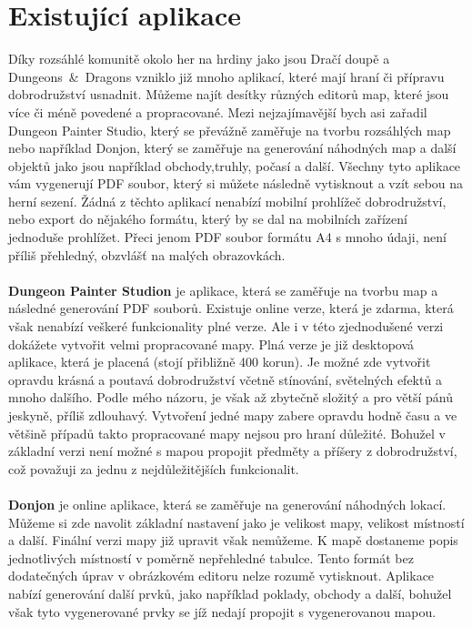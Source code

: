 \documentclass[thesis=B,czech]{resources/FITthesis}[2012/06/26]
\begin{document}
	\section{Existující aplikace}
Díky rozsáhlé komunitě okolo her na hrdiny jako jsou Dračí doupě a Dungeons~\&~Dragons vzniklo již mnoho aplikací, které mají hraní či přípravu dobrodružství usnadnit. Můžeme najít desítky různých editorů map, které jsou více či méně povedené a propracované. Mezi nejzajímavější bych asi zařadil Dungeon Painter Studio, který se převážně zaměřuje na tvorbu rozsáhlých map nebo například Donjon, který se zaměřuje na generování náhodných map a další objektů jako jsou například obchody,truhly, počasí a další. Všechny tyto aplikace vám vygenerují PDF soubor, který si můžete následně vytisknout a vzít sebou na herní sezení. Žádná z těchto aplikací nenabízí mobilní prohlížeč dobrodružství, nebo export do nějakého formátu, který by se dal na mobilních zařízení jednoduše prohlížet. Přeci jenom PDF soubor formátu A4 s mnoho údaji, není příliš přehledný, obzvlášť na malých obrazovkách. \\
\\
\textbf{Dungeon Painter Studion} je aplikace, která se zaměřuje na tvorbu map a následné generování PDF souborů. Existuje online verze, která je zdarma, která však nenabízí veškeré funkcionality plné verze. Ale i v této zjednodušené verzi dokážete vytvořit velmi propracované mapy. Plná verze je již desktopová aplikace, která je placená (stojí  přibližně 400 korun). Je možné zde vytvořit opravdu krásná a poutavá dobrodružství včetně stínování, světelných efektů a mnoho dalšího. Podle mého názoru, je však až zbytečně složitý a pro větší pánů jeskyně, příliš zdlouhavý. Vytvoření jedné mapy zabere opravdu hodně času a ve většině případů takto propracované mapy nejsou pro hraní důležité. Bohužel v základní verzi není možné s mapou propojit předměty a příšery z dobrodružství, což považuji za jednu z nejdůležitějších funkcionalit. \\
\\
\textbf{Donjon} je online aplikace, která se zaměřuje na generování náhodných lokací. Můžeme si zde navolit základní nastavení jako je velikost mapy, velikost místností a další. Finální verzi mapy již upravit však nemůžeme. K mapě dostaneme popis jednotlivých místností v poměrně nepřehledné tabulce. Tento formát bez dodatečných úprav v obrázkovém editoru nelze rozumě vytisknout. Aplikace nabízí generování další prvků, jako například poklady, obchody a další, bohužel však tyto vygenerované prvky se jíž nedají propojit s vygenerovanou mapou. 
\end{document}
